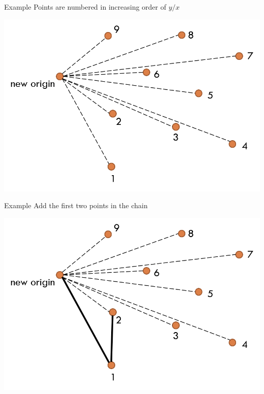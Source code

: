 \documentclass[13pt,onlymath]{beamer}
\begin{document}
\begin{frame}{Example}
Points are numbered in increasing order of $y/x$
\begin{center}
\includegraphics[height=0.5\textheight]{figures/graham1}
\end{center}
\end{frame}

\begin{frame}{Example}
Add the first two points in the chain
\begin{center}
\includegraphics[height=0.5\textheight]{figures/graham2}
\end{center}
\end{frame}
\end{document}
